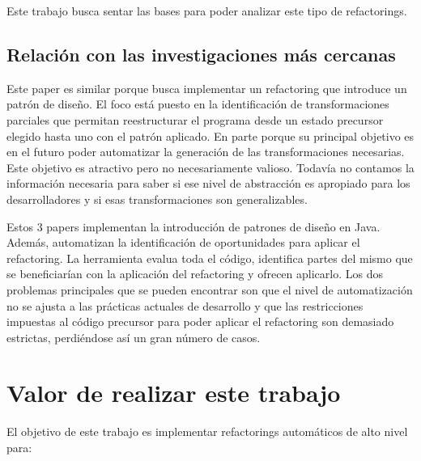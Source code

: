 Este trabajo busca sentar las bases para poder analizar este tipo de refactorings.



\subsection{Relación con las investigaciones más cercanas}
Este paper es similar porque busca implementar un refactoring que introduce un patrón de diseño. El
foco está puesto en la identificación de transformaciones parciales que permitan reestructurar el
programa desde un estado precursor elegido hasta uno con el patrón aplicado. En parte porque su
principal objetivo es en el futuro poder automatizar la generación de las transformaciones
necesarias. Este objetivo es atractivo pero no necesariamente valioso. Todavía no contamos la
información necesaria para saber si ese nivel de abstracción es apropiado para los desarrolladores
y si esas transformaciones son generalizables.

Estos 3 papers implementan la introducción de patrones de diseño en Java. Además, automatizan la
identificación de oportunidades para aplicar el refactoring. La herramienta evalua toda el código,
identifica partes del mismo que se beneficiarían con la aplicación del refactoring y ofrecen
aplicarlo. Los dos problemas principales
que se pueden encontrar son que el nivel de automatización no se ajusta a las prácticas actuales de
desarrollo y que las restricciones impuestas al código precursor para poder aplicar el refactoring
son demasiado estrictas, perdiéndose así un gran número de casos.



\section{Valor de realizar este trabajo}

El objetivo de este trabajo es implementar refactorings automáticos de alto nivel para:

